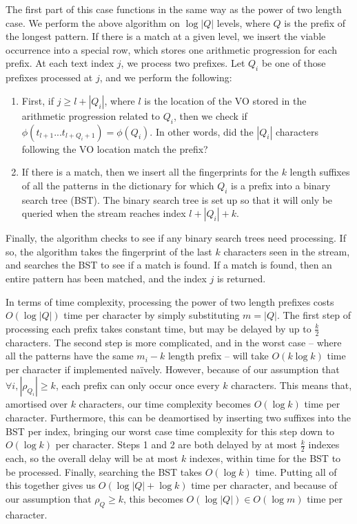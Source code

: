 \documentclass[ %
                    author={Dominic Joseph Moylett},
                    degree={MEng},
                     title={Dictionary Matching with Fingerprints},
                  subtitle={An Empirical Analysis},
                      type={research},
                      year={2015} ]{dissertation}
\begin{document}
The first part of this case functions in the same way as the power of two length case. We perform the above algorithm on $\log|Q|$ levels, where $Q$ is the prefix of the longest pattern. If there is a match at a given level, we insert the viable occurrence into a special row, which stores one arithmetic progression for each prefix. At each text index $j$, we process two prefixes. Let $Q_i$ be one of those prefixes processed at $j$, and we perform the following:

\begin{enumerate}
  \item First, if $j \geq l + |Q_i|$, where $l$ is the location of the VO stored in the arithmetic progression related to $Q_i$, then we check if $\phi(t_{l+1}...t_{l+Q_i+1}) = \phi(Q_i)$. In other words, did the $|Q_i|$ characters following the VO location match the prefix?
  \item If there is a match, then we insert all the fingerprints for the $k$ length suffixes of all the patterns in the dictionary for which $Q_i$ is a prefix into a binary search tree (BST). The binary search tree is set up so that it will only be queried when the stream reaches index $l + |Q_i| + k$.
\end{enumerate}

Finally, the algorithm checks to see if any binary search trees need processing. If so, the algorithm takes the fingerprint of the last $k$ characters seen in the stream, and searches the BST to see if a match is found. If a match is found, then an entire pattern has been matched, and the index $j$ is returned.

In terms of time complexity, processing the power of two length prefixes costs $O(\log|Q|)$ time per character by simply substituting $m = |Q|$. The first step of processing each prefix takes constant time, but may be delayed by up to $\frac{k}{2}$ characters. The second step is more complicated, and in the worst case  --  where all the patterns have the same $m_i - k$ length prefix  --  will take $O(k\log k)$ time per character if implemented na\"{i}vely. However, because of our assumption that $\forall i, |\rho_{Q_i}| \geq k$, each prefix can only occur once every $k$ characters. This means that, amortised over $k$ characters, our time complexity becomes $O(\log k)$ time per character. Furthermore, this can be deamortised by inserting two suffixes into the BST per index, bringing our worst case time complexity for this step down to $O(\log k)$ per character. Steps 1 and 2 are both delayed by at most $\frac{k}{2}$ indexes each, so the overall delay will be at most $k$ indexes, within time for the BST to be processed. Finally, searching the BST takes $O(\log k)$ time. Putting all of this together gives us $O(\log|Q| + \log k)$ time per character, and because of our assumption that $\rho_Q \geq k$, this becomes $O(\log|Q|) \in O(\log m)$ time per character.
\end{document}
